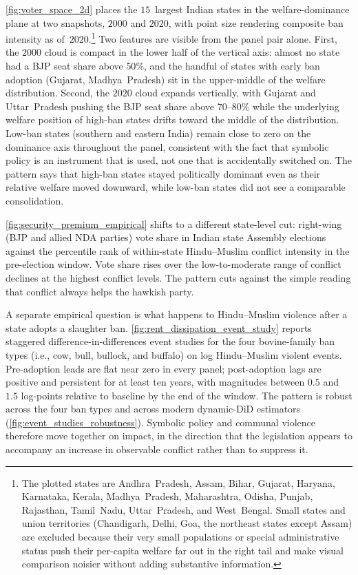 \autoref{fig:voter_space_2d} places the $15$~largest Indian states in the
welfare-dominance plane at two snapshots, $2000$ and $2020$, with point
size rendering composite ban intensity as of~$2020$.\footnote{The plotted
states are Andhra~Pradesh, Assam, Bihar, Gujarat, Haryana, Karnataka,
Kerala, Madhya~Pradesh, Maharashtra, Odisha, Punjab, Rajasthan, Tamil~Nadu,
Uttar~Pradesh, and West~Bengal. Small states and union territories
(Chandigarh, Delhi, Goa, the northeast states except Assam) are excluded
because their very small populations or special administrative status push
their per-capita welfare far out in the right tail and make visual
comparison noisier without adding substantive information.} Two features
are visible from the panel pair alone. First, the $2000$ cloud is compact
in the lower half of the vertical axis: almost no state had a BJP seat
share above $50\%$, and the handful of states with early ban adoption
(Gujarat, Madhya~Pradesh) sit in the upper-middle of the welfare
distribution. Second, the $2020$ cloud expands vertically, with Gujarat
and Uttar~Pradesh pushing the BJP seat share above $70$--$80\%$ while the
underlying welfare position of high-ban states drifts toward the middle
of the distribution. Low-ban states (southern and eastern India) remain
close to zero on the dominance axis throughout the panel, consistent with
the fact that symbolic policy is an instrument that is used, not one that
is accidentally switched on. The pattern says that high-ban states stayed
politically dominant even as their relative welfare moved downward, while
low-ban states did not see a comparable consolidation.

\autoref{fig:security_premium_empirical} shifts to a different state-level
cut: right-wing (BJP and allied NDA parties) vote share in Indian state
Assembly elections against the percentile rank of within-state
Hindu--Muslim conflict intensity in the pre-election window. Vote share rises over the low-to-moderate range of conflict declines at the highest conflict levels.
The pattern cuts against the simple reading that conflict always helps
the hawkish party.

A separate empirical question is what
happens to Hindu--Muslim violence after a state adopts a slaughter ban.
\autoref{fig:rent_dissipation_event_study} reports staggered
difference-in-differences event studies for the four bovine-family ban
types (i.e., cow, bull, bullock, and buffalo) on log Hindu--Muslim violent
events. Pre-adoption leads are flat near zero in every panel; post-adoption
lags are positive and persistent for at least ten years, with magnitudes
between $0.5$ and $1.5$ log-points relative to baseline by the end of the
window. The pattern is robust across the four ban types and across modern
dynamic-DiD estimators (\autoref{fig:event_studies_robustness}). Symbolic policy and
communal violence therefore move together on impact, in the direction
that the legislation appears to accompany an
increase in observable conflict rather than to suppress it.

